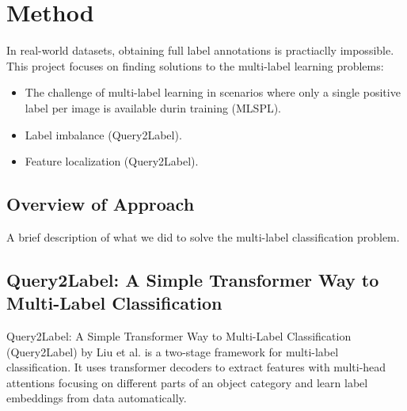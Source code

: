 \documentclass[lettersize,journal]{IEEEtran}
\begin{document}




\section{Method}

In real-world datasets, obtaining full label annotations is practiaclly impossible.
This project focuses on finding solutions to the multi-label learning problems:
\begin{itemize} 
    \item  The challenge of multi-label learning in scenarios where only a single positive label per image is available durin training (MLSPL).
    \item Label imbalance (Query2Label).
    \item Feature localization (Query2Label).
\end{itemize}

\subsection{Overview of Approach}
A brief description of what we did to solve the multi-label classification problem. 



\subsection{Query2Label: A Simple Transformer Way to Multi-Label Classification}
\label{sec:q2l_method}
Query2Label: A Simple Transformer Way to Multi-Label Classification (Query2Label) by Liu et al. \cite{Query2Label} is a two-stage framework for multi-label classification. It uses transformer decoders to extract features with multi-head attentions focusing on different parts of an object category and learn label embeddings from data automatically.
\end{document}
